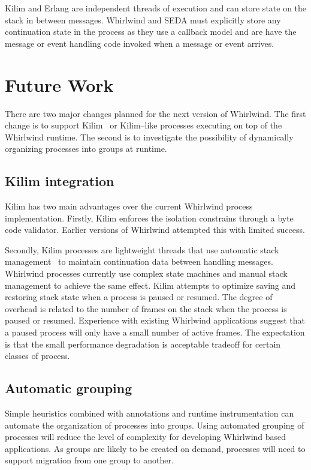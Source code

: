 \documentclass[conference]{IEEEtran}
\begin{document}
Kilim and Erlang are independent threads of execution and can store state on the stack in between messages. Whirlwind and SEDA must explicitly store any continuation state in the process as they use a callback model and are have the message or event handling code invoked when a message or event arrives.

\section{Future Work}

There are two major changes planned for the next version of Whirlwind. The first change is to support Kilim~\cite{Srinivasan:08:Kilim} or Kilim--like processes executing on top of the Whirlwind runtime. The second is to investigate the possibility of dynamically organizing processes into groups at runtime.

\subsection{Kilim integration}

Kilim has two main advantages over the current Whirlwind process implementation. Firstly, Kilim enforces the isolation constrains through a byte code validator. Earlier versions of Whirlwind attempted this with limited success. 

Secondly, Kilim processes are lightweight threads that use automatic stack management~\cite{Adya02Cooperative} to maintain continuation data between handling messages. 
Whirlwind processes currently use complex state machines and manual stack management to achieve the same effect. Kilim attempts to optimize saving and restoring stack state when a process is paused or resumed. The degree of overhead is related to the number of frames on the stack when the process is paused or resumed. Experience with existing Whirlwind applications suggest that a paused process will only have a small number of active frames. The expectation is that the small performance degradation is acceptable tradeoff for certain classes of process.

\subsection{Automatic grouping}

Simple heuristics combined with annotations and runtime instrumentation can automate the organization of processes into groups. Using automated grouping of processes will reduce the level of complexity for developing Whirlwind based applications. As groups are likely to be created on demand, processes will need to support migration from one group to another.
\end{document}
